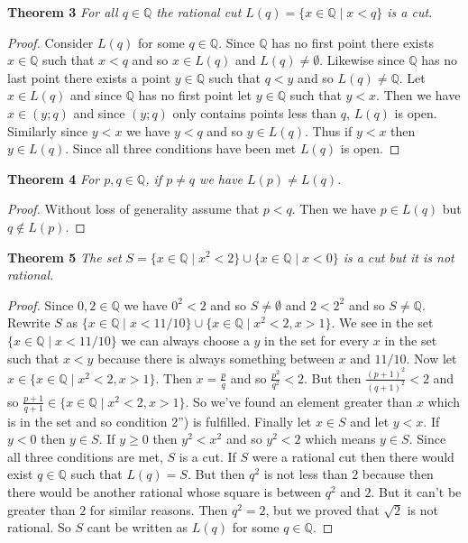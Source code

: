 \documentclass{article}
\begin{document}
\begin{flushleft}
\textbf{Theorem 3}
\textsl{For all $q \in \mathbb{Q}$ the rational cut $L(q) = \{x \in \mathbb{Q} \mid x < q\}$ is a cut.}
\begin{proof}
Consider $L(q)$ for some $q \in \mathbb{Q}$. Since $\mathbb{Q}$ has no first point there exists $x \in \mathbb{Q}$ such that $x<q$ and so $x \in L(q)$ and $L(q) \neq \emptyset$. Likewise since $\mathbb{Q}$ has no last point there exists a point $y \in \mathbb{Q}$ such that $q<y$ and so $L(q) \neq \mathbb{Q}$. Let $x \in L(q)$ and since $\mathbb{Q}$ has no first point let $y \in \mathbb{Q}$ such that $y<x$. Then we have $x \in (y;q)$ and since $(y;q)$ only contains points less than $q$, $L(q)$ is open. Similarly since $y < x$ we have $y<q$ and so $y \in L(q)$. Thus if $y<x$ then $y \in L(q)$. Since all three conditions have been met $L(q)$ is open.
\end{proof}

\textbf{Theorem 4}
\textsl{For $p,q \in \mathbb{Q}$, if $p \neq q$ we have $L(p) \neq L(q)$.}
\begin{proof}
Without loss of generality assume that $p<q$. Then we have $p \in L(q)$ but $q \notin L(p)$.
\end{proof}

\textbf{Theorem 5}
\textsl{The set $S=\{x \in \mathbb{Q} \mid x^2 < 2\} \cup \{x \in \mathbb{Q} \mid x < 0\}$ is a cut but it is not rational.}
\begin{proof}
Since $0,2 \in \mathbb{Q}$ we have $0^2<2$ and so $S \neq \emptyset$ and $2<2^2$ and so $S \neq \mathbb{Q}$. Rewrite $S$ as $\{x \in \mathbb{Q} \mid x<11/10\} \cup \{x \in \mathbb{Q} \mid x^2<2, x>1\}$. We see in the set $\{x \in \mathbb{Q} \mid x<11/10\}$ we can always choose a $y$ in the set for every $x$ in the set such that $x<y$ because there is always something between $x$ and $11/10$. Now let $x \in \{x \in \mathbb{Q} \mid x^2<2, x>1\}$. Then $x=\frac{p}{q}$ and so $\frac{p^2}{q^2}<2$. But then $\frac{(p+1)^2}{(q+1)^2}<2$ and so $\frac{p+1}{q+1} \in \{x \in \mathbb{Q} \mid x^2<2, x>1\}$. So we've found an element greater than $x$ which is in the set and so condition 2'') is fulfilled. Finally let $x \in S$ and let $y<x$. If $y<0$ then $y \in S$. If $y \geq 0$ then $y^2<x^2$ and so $y^2<2$ which means $y \in S$. Since all three conditions are met, $S$ is a cut. If $S$ were a rational cut then there would exist $q \in \mathbb{Q}$ such that $L(q)=S$. But then $q^2$ is not less than $2$ because then there would be another rational whose square is between $q^2$ and $2$. But it can't be greater than $2$ for similar reasons. Then $q^2=2$, but we proved that $\sqrt{2}$ is not rational. So $S$ cant be written as $L(q)$ for some $q \in \mathbb{Q}$.
\end{proof}


\end{flushleft}
\end{document}
